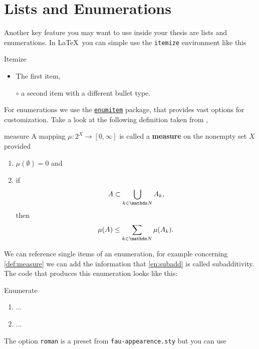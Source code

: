 \section{Lists and Enumerations}
Another key feature you may want to use inside your thesis are lists and enumerations.
In \LaTeX\ you can simple use the \lstinline[language={[LaTeX]TeX}]|itemize| environment 
like this
\begin{lstbox}[]{Itemize}
\begin{itemize}
\item The first item,
\item[$\circ$] a second item with a different bullet type.
\end{itemize}
\end{lstbox}
For enumerations we use the
\href{https://ctan.org/pkg/enumitem}{\texttt{enumitem}} package, that provides vast 
options for customization. Take a look at the following definition taken from 
\cite{Evans15},
\begin{definition}{}{measure}
A mapping $\mu:2^{X}\rightarrow[0,\infty]$ is called a {\bfseries measure} on the nonempty
set $X$ provided
\begin{enumerate}[roman, ref=\thetcbcounter (\roman*)]
\item $\mu(\emptyset) = 0$ and
\item\label{en:subadd} if
\begin{equation*}
A\subset \bigcup_{k\in\N}A_k,
\end{equation*}
then
\begin{equation*}
\mu(A)\leq \sum_{k\in\N}\mu(A_k).
\end{equation*}
\end{enumerate}
\end{definition}
We can reference single items of an enumeration, for example concerning \cref{def:measure} 
we can add the information that \cref{en:subadd} is called subadditivity. 
The code that produces this enumeration looks like this:
\begin{lstbox}{Enumerate}
\begin{enumerate}[roman, ref=\thetcbcounter (\roman*)]
\item ... %
\item\label{en:subadd} ... %
\end{enumerate} 
\end{lstbox}
The option \texttt{roman} is a preset from \texttt{fau-appearence.sty} but you can use 
